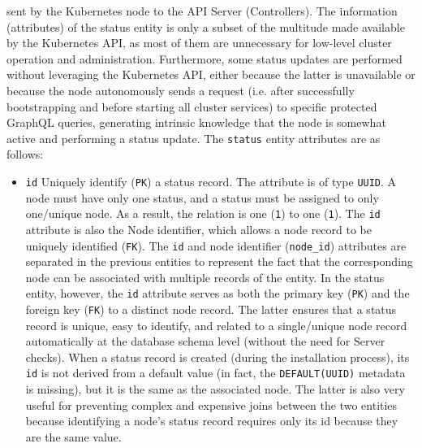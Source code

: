 sent by the Kubernetes node to the API Server (Controllers). The information (attributes)
of the status entity is only a subset of the multitude made available by the Kubernetes
API, as most of them are unnecessary for low-level cluster operation and
administration. Furthermore, some status updates are performed without
leveraging the Kubernetes API, either because the latter is unavailable or because
the node autonomously sends a request (i.e. after successfully bootstrapping and
before starting all cluster services) to specific protected GraphQL queries, generating
intrinsic knowledge that the node is somewhat active and performing a status update.
\newline
The \texttt{status} entity attributes are as follows:

\begin{itemize}
  \item \texttt{id}
    \newline
    Uniquely identify (\texttt{PK}) a status record.
    \newline
    The attribute is of type \texttt{UUID}.
    \newline
    A node must have only one status, and a status must be assigned to only one/unique
    node. As a result, the relation is one (\texttt{1}) to one (\texttt{1}).
    \newline
    The \texttt{id} attribute is also the Node identifier, which allows a node
    record to be uniquely identified (\texttt{FK}). The \texttt{id} and node identifier
    (\texttt{node\_id}) attributes are separated in the previous entities to
    represent the fact that the corresponding node can be associated with
    multiple records of the entity. In the status entity, however, the \texttt{id}
    attribute serves as both the primary key (\texttt{PK}) and the foreign key (\texttt{FK})
    to a distinct node record. The latter ensures that a status record is unique,
    easy to identify, and related to a single/unique node record automatically at
    the database schema level (without the need for Server checks). When a
    status record is created (during the installation process), its \texttt{id}
    is not derived from a default value (in fact, the \texttt{DEFAULT(UUID)}
    metadata is missing), but it is the same as the associated node. The latter is
    also very useful for preventing complex and expensive joins between the two entities
    because identifying a node's status record requires only its id because they
    are the same value.


\end{itemize}
